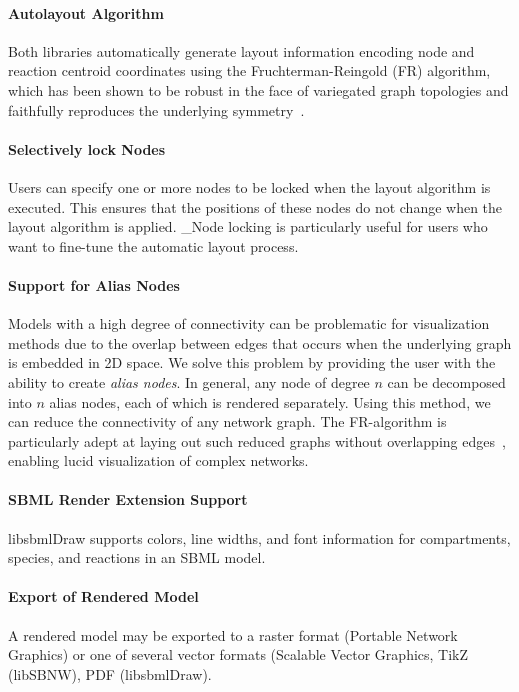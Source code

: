 \documentclass{bioinfo}
\begin{document}
\paragraph{Autolayout Algorithm}
Both libraries automatically generate layout information encoding 
node and reaction centroid coordinates using the Fruch\-terman-Reingold (FR) algorithm, which has been shown to be robust in the face of variegated graph topologies and faithfully reproduces the underlying symm\-etry~\citep{FruchtermanReingold}. 

\paragraph{Selectively lock Nodes} Users can specify one or more nodes to be locked when the layout algorithm is executed. This ensures that the positions of these nodes do not change when the layout algorithm is applied.
_Node locking is particularly useful for users who want to fine-tune the automatic layout process.

\paragraph{Support for Alias Nodes}
Models with a high degree of connectivity can be problematic for visualization
methods due to the overlap between edges that occurs when the underlying 
graph is embedded in 2D space.
We solve this problem by providing the user
with the ability to create \textit{alias nodes}. In general, any node of degree
$n$ can be decomposed into $n$ alias nodes, each of which is rendered separately.
Using this method, we can reduce the connectivity of any network graph.
The FR-algorithm is particularly adept at laying out such reduced graphs without overlapping edges~\citep{FruchtermanReingold}, 
enabling lucid visualization of complex networks.

\paragraph{SBML Render Extension Support} 
libsbmlDraw supports colors, line widths, and font information for compartments, species, and reactions in an SBML model.

\paragraph{Export of Rendered Model}
A rendered model may be exported to a raster format (Portable Network Graphics) or one of several vector formats (Scalable Vector Graphics, TikZ (libSBNW), PDF (libsbmlDraw). 
\end{document}
